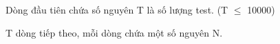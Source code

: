 Dòng đầu tiên chứa số nguyên T là số lượng test. (T  $\le$  10000)  

   T dòng tiếp theo, mỗi dòng chứa một số nguyên N.